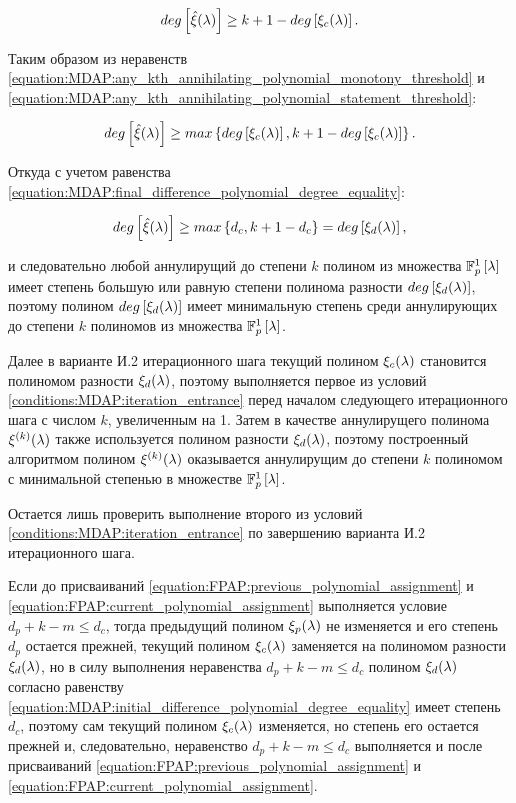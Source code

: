 	\begin{equation} \label{equation:MDAP:any_kth_annihilating_polynomial_statement_threshold}
		deg \left [ \hat\xi (\lambda) \right ] \ge k + 1 - deg \left [ \xi_c (\lambda) \right ].
	\end{equation}

Таким образом из неравенств \eqref{equation:MDAP:any_kth_annihilating_polynomial_monotony_threshold} и
\eqref{equation:MDAP:any_kth_annihilating_polynomial_statement_threshold}:

	$$ deg \left [ \hat\xi (\lambda) \right ] \ge max \left \{ deg \left [ \xi_c (\lambda) \right ] , k + 1 - deg \left [ \xi_c (\lambda) \right ] \right \}. $$

Откуда с учетом равенства \eqref{equation:MDAP:final_difference_polynomial_degree_equality}:

	$$ deg \left [ \hat\xi (\lambda) \right ] \ge max \left \{ d_c , k + 1 - d_c \right \} = deg \left [ \xi_d (\lambda) \right ], $$

и следовательно любой аннулирущий до степени $k$ полином из множества $\mathbb{F}_p^1 \left [ \lambda \right ]$ имеет степень большую или равную степени полинома
разности $deg \left [ \xi_d (\lambda) \right ]$, поэтому полином $deg \left [ \xi_d (\lambda) \right ]$ имеет минимальную степень среди аннулирующих до степени $k$
полиномов из множества $\mathbb{F}_p^1 \left [ \lambda \right ]$.

Далее в варианте И.2 итерационного шага текущий полином $\xi_c (\lambda)$ становится полиномом разности $\xi_d (\lambda)$, поэтому
выполняется первое из условий \ref{conditions:MDAP:iteration_entrance} перед началом следующего итерационного шага с числом $k$, увеличенным
на 1. Затем в качестве аннулирущего полинома $\xi^{(k)} (\lambda)$ также используется полином разности $\xi_d (\lambda)$, поэтому
построенный алгоритмом полином $\xi^{(k)} (\lambda)$ оказывается аннулирущим до степени $k$ полиномом с минимальной степенью в множестве
$\mathbb{F}_p^1 \left [ \lambda \right ]$.

Остается лишь проверить выполнение второго из условий \ref{conditions:MDAP:iteration_entrance} по завершению варианта И.2 итерационного шага.

Если до присваиваний \eqref{equation:FPAP:previous_polynomial_assignment} и \eqref{equation:FPAP:current_polynomial_assignment} выполняется
условие $d_p + k - m \le d_c$, тогда предыдущий полином $\xi_p (\lambda)$ не изменяется и его степень $d_p$ остается прежней, текущий
полином $\xi_c (\lambda)$ заменяется на полиномом разности $\xi_d (\lambda)$, но в силу выполнения неравенства $d_p + k - m \le d_c$
полином $\xi_d (\lambda)$ согласно равенству \eqref{equation:MDAP:initial_difference_polynomial_degree_equality} имеет степень $d_c$,
поэтому сам текущий полином $\xi_c (\lambda)$ изменяется, но степень его остается прежней и, следовательно, неравенство $d_p + k - m \le d_c$
выполняется и после присваиваний \eqref{equation:FPAP:previous_polynomial_assignment} и \eqref{equation:FPAP:current_polynomial_assignment}.

